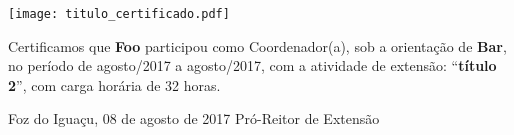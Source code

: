 \documentclass[a4paper,brazil]{article}%
\begin{document}
%
\normalsize%

\pagestyle{empty}
\BgThispage
%
\vspace*{2cm}%
\begin{flushright}%
\texttt{[image: titulo\_certificado.pdf]}%
\linebreak%
\end{flushright}%
\vspace*{-1cm}%
\Large%
%


    Certificamos que \textbf{Foo} participou como Coordenador(a), sob a orientação de \textbf{Bar}, no período de agosto/2017 a agosto/2017, com a atividade de extensão: ``\textbf{título 2}'', com carga horária de 32 horas.

\vspace*{1.5cm}%
\hspace*{7cm}%
\begin{minipage}{\widthof{Foz do Iguaçu, 08 de agosto de 2017}}%
\begin{center}%
Foz do Iguaçu, 08 de agosto de 2017%
\newline%
\newline%
\newline%
Pró{-}Reitor de Extensão%
\end{center}%
\end{minipage}%
\end{document}
